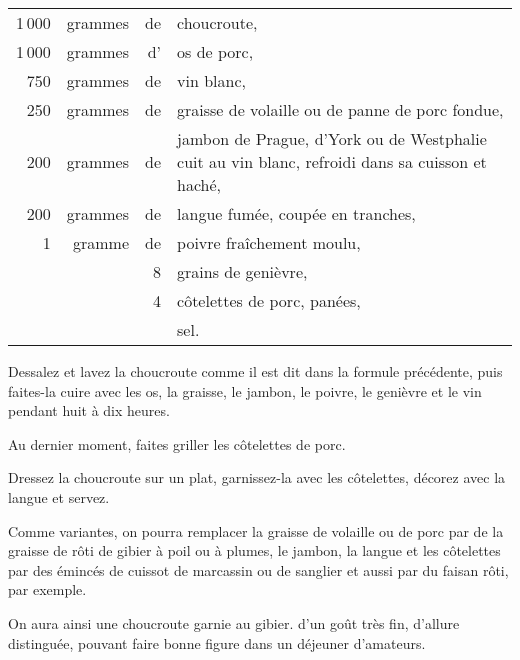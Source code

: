 \footnotesize
\begin{longtable}{rrrp{16em}}
  1 000 & grammes & de & choucroute,                                                                      \\
  1 000 & grammes & d' & os de porc,                                                                      \\
    750 & grammes & de & vin blanc,                                                                       \\
    250 & grammes & de & graisse de volaille ou de panne de porc fondue,                                  \\
    200 & grammes & de & jambon de Prague, d'York ou de Westphalie cuit
                         au vin blanc, refroidi dans sa cuisson et haché,                                 \\
    200 & grammes & de & langue fumée, coupée en tranches,                                                \\
      1 & gramme  & de & poivre fraîchement moulu,                                                        \\
        &         &  8 & grains de genièvre,                                                              \\
        &         &  4 & côtelettes de porc, panées,                                                      \\
        &         &    & sel.                                                                             \\
\end{longtable}
\normalsize

Dessalez et lavez la choucroute comme il est dit dans la formule précédente,
puis faites-la cuire avec les os, la graisse, le jambon, le poivre, le genièvre
et le vin pendant huit à dix heures.

Au dernier moment, faites griller les côtelettes de porc.

Dressez la choucroute sur un plat, garnissez-la avec les côtelettes, décorez
avec la langue et servez.

\sk

Comme variantes, on pourra remplacer la graisse de volaille ou de porc par de
la graisse de rôti de gibier à poil ou à plumes, le jambon, la langue et les
côtelettes par des émincés de cuissot de marcassin ou de sanglier et aussi par
du faisan rôti, par exemple.

On aura ainsi une choucroute garnie au gibier. d'un goût très fin, d'allure
distinguée, pouvant faire bonne figure dans un déjeuner d'amateurs.

